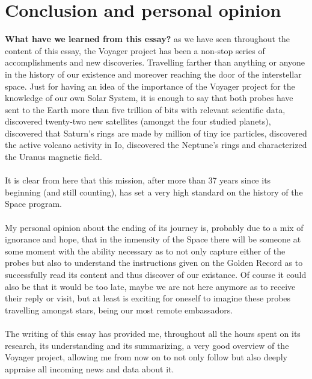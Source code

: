 \documentclass[11pt,a4paper]{article}
\begin{document}
\section{Conclusion and personal opinion}
\textbf{What have we learned from this essay?}
as we have seen throughout the content of this essay, the Voyager project has been a non-stop series of accomplishments and new discoveries. Travelling farther than anything or anyone in the history of our existence and moreover reaching the door of the interstellar space. Just for having an idea of the importance of the Voyager project for the knowledge of our own Solar System, it is enough to say that both probes have sent to the Earth more than five trillion of bits with relevant scientific data, discovered twenty-two new satellites (amongst the four studied planets), discovered that Saturn's rings are made by million of tiny ice particles, discovered the active volcano activity in Io, discovered the Neptune's rings and characterized the Uranus magnetic field.
\\\\
It is clear from here that this mission, after more than 37 years since its beginning (and still counting), has set a very high standard on the history of the Space program.
\\\\
My personal opinion about the ending of its journey is, probably due to a mix of ignorance and hope, that in the inmensity of the Space there will be someone at some moment with the ability necessary as to not only capture either of the probes but also to understand the instructions given on the Golden Record as to successfully read its content and thus discover of our existance. Of course it could also be that it would be too late, maybe we are not here anymore as to receive their reply or visit, but at least is exciting for oneself to imagine these probes travelling amongst stars, being our most remote embassadors.
\\\\
The writing of this essay has provided me, throughout all the hours spent on its research, its understanding and its summarizing, a very good overview of the Voyager project, allowing me from now on to not only follow but also deeply appraise all incoming news and data about it.
\end{document}
